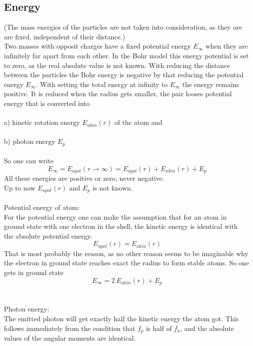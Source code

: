 \documentclass[10pt,titlepage]{article}
\begin{document}
\subsection{Energy}
(The mass energies of the particles are not taken into consideration, as  they are are fixed, independent of their distance.)\\
Two masses with opposit charges have a fixed potential energy $E_\infty$ when they are infinitely far apart from each other. In the Bohr model this energy potential is set to zero, as the real absolute value is not known. With reducing the distance between the particles the Bohr energy is negative by that reducing the potential energy $E_\infty$. With setting the total energy at infinity to $E_\infty$ the energy remains positive. It is reduced when the radius gets smaller, the pair looses potential energy that is converted into
\\\\
a) kinetic rotation energy $E_{akin}(r)$ of the atom and 
\\\\
b) photon energy $E_p$
\\\\
So one can write 
\begin{equation}
\ E_\infty=E_{apot}(r\rightarrow \infty)=E_{apot}(r)+E_{akin}(r)+E_p
\end{equation}
All these energies are positive or zero, never negative.
\\Up to now $E_{apot}(r)$ and $E_p$ is not known. 
\\\\
Potential energy of atom:\\
For the potential energy one can make the assumption that for an atom in ground state with one electron in the shell, the kinetic energy is identical with the absolute potential energy.
 \begin{equation}
\ E_{apot}(r)=E_{akin}(r)
\end{equation}
That is most probably the reason, as no other reason seems to be imaginable why the electron in ground state reaches exact the radius to form stable atoms.
So one gets in ground state
\begin{equation}
\ E_\infty=2 \ E_{akin}(r)+E_p
\end{equation}
\\\\
Photon energy:\\
The emitted photon will get exactly half the kinetic energy the atom got. This follows immediately from the condition that $f_p$ is half of $f_a$, and the absolute values of the angular moments are identical.
\end{document}
